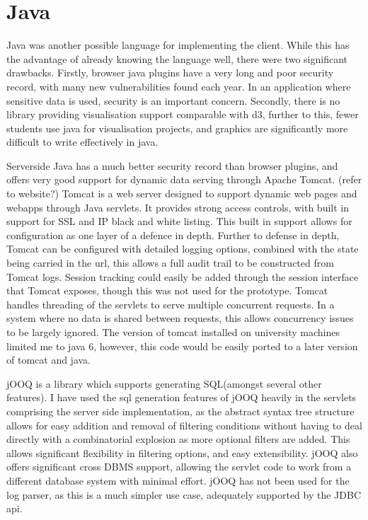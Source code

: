 \section{Java}

Java was another possible language for implementing the client. While this has the advantage of already knowing the language well, there were two significant drawbacks. Firstly, browser java plugins have a very long and poor security record, with many new vulnerabilities found each year. In an application where sensitive data is used, security is an important concern. Secondly, there is no library providing visualisation support comparable with d3, further to this, fewer students use java for visualisation projects, and graphics are significantly more difficult to write effectively in java. 

Serverside Java has a much better security record than browser plugins, and offers very good support for dynamic data serving through Apache Tomcat. (refer to website?) Tomcat is a web server designed to support dynamic web pages and webapps through Java servlets. It provides strong access controls, with built in support for SSL and IP black and white listing. This built in support allows for configuration as one layer of a defence in depth. Further to defense in depth, Tomcat can be configured with detailed logging options, combined with the state being carried in the url, this allows a full audit trail to be constructed from Tomcat logs. Session tracking could easily be added through the session interface that Tomcat exposes, though this was not used for the prototype.
Tomcat handles threading of the servlets to serve multiple concurrent requests. In a system where no data is shared between requests, this allows concurrency issues to be largely ignored. The version of tomcat installed on university machines limited me to java 6, however, this code would be easily ported to a later version of tomcat and java. 

jOOQ is a library which supports generating SQL(amongst several other features). I have used the sql generation features of jOOQ heavily in the servlets comprising the server side implementation, as the abstract syntax tree structure allows for easy addition and removal of filtering conditions without having to deal directly with a combinatorial explosion as more optional filters are added. This allows significant flexibility in filtering options, and easy extensibility. jOOQ also offers significant cross DBMS support, allowing the servlet code to work from a different database system with minimal effort.
jOOQ has not been used for the log parser, as this is a much simpler use case, adequately supported by the JDBC api.

